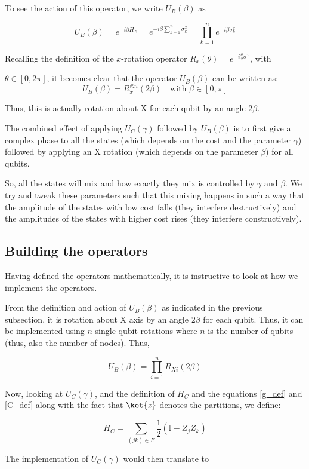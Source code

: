 To see the action of this operator, we write $U_B(\beta)$ as

\[
    U_B(\beta)= e^{-i\beta H_B} = e^{-i\beta\sum_{k=1}^n \sigma_k^x} = \prod_{k=1}^n e^{-i\beta \sigma_k^x}
\]

Recalling the definition of the $x$-rotation operator $R_x(\theta)=e^{-i\frac{\theta}{2}\sigma^x}$, with 

$\theta\in [0,2\pi]$, it becomes clear that the operator $U_B(\beta)$ can be written as:
\[
    U_B(\beta)= R_x^{\otimes n}(2\beta)\quad\text{with }\beta\in [0,\pi]
\]

Thus, this is actually rotation about X for each qubit by an angle $2\beta$.

The combined effect of applying $U_C(\gamma)$ followed by $U_B(\beta)$ is to first give a complex phase to all the states (which depends on the cost and the parameter $\gamma$) followed by applying an X rotation (which depends on the parameter $\beta$) for all qubits.

So, all the states will mix and how exactly they mix is controlled by $\gamma$ and $\beta$.
We try and tweak these parameters such that this mixing happens in such a way that the amplitude of the states with low cost falls (they interfere destructively) and the amplitudes of the states with higher cost rises (they interfere constructively).

\subsection{Building the operators}
Having defined the operators mathematically, it is instructive to look at how we implement the operators.

From the definition and action of $U_B(\beta)$ as indicated in the previous subsection, it is rotation about X axis by an angle $2\beta$ for each qubit. Thus, it can be implemented using $n$ single qubit rotations where $n$ is the number of qubits (thus, also the number of nodes). Thus,

$$U_B(\beta)=\prod_{i=1}^{n} R_{Xi}(2\beta)$$

Now, looking at $U_C(\gamma)$, and the definition of $H_C$ and the equations \ref{g_def} and \ref{C_def} along with the fact that $\ket{z}$ denotes the partitions, we define:

$$H_C = \sum_{(jk) \in E} \frac{1}{2}(\mathbb{I}- Z_j Z_k)$$

The implementation of $U_C(\gamma)$ would then translate to 

